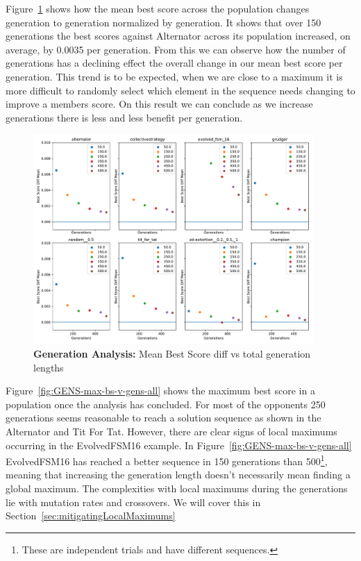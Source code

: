 Figure~\ref{fig:GENS-mean-bs-diff-v-gens-all} shows how the mean best score across the population changes generation to generation normalized by generation.
It shows that over 150 generations the best scores against Alternator across its population increased, on average, by 0.0035 per generation.
From this we can observe how the number of generations has a declining effect the overall change in our mean best score per generation.
This trend is to be expected, when we are close to a maximum it is more difficult to randomly select which element in the sequence needs changing to improve a members score.
On this result we can conclude as we increase generations there is less and less benefit per generation.

\begin{figure}[ht]
    \includegraphics[width=0.95\textwidth, keepaspectratio, center]{./img/plots/GENS_mean_bs_diff_v_gens_all.pdf}
    \caption{\textbf{Generation Analysis:} Mean Best Score diff vs total generation lengths}\label{fig:GENS-mean-bs-diff-v-gens-all}
\end{figure}

Figure~\ref{fig:GENS-max-bs-v-gens-all} shows the maximum best score in a population once the analysis has concluded.
For most of the opponents 250 generations seems reasonable to reach a solution sequence as shown in the Alternator and Tit For Tat.
However, there are clear signs of local maximums occurring in the EvolvedFSM16 example.
In Figure~\ref{fig:GENS-max-bs-v-gens-all} EvolvedFSM16 has reached a better sequence in 150 generations than 500\footnote{These are independent trials and have different sequences.}, meaning that increasing the generation length doesn't necessarily mean finding a global maximum.
The complexities with local maximums during the generations lie with mutation rates and crossovers.
We will cover this in Section~\ref{sec:mitigatingLocalMaximums}


